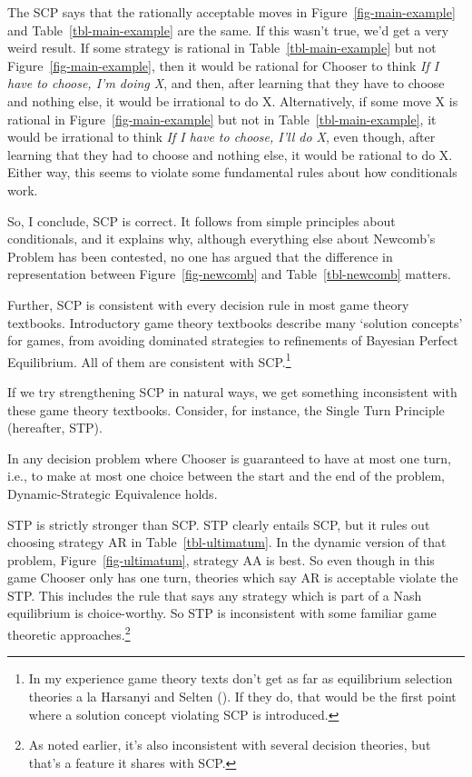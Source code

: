 \documentclass[
  10pt,
  letterpaper,
  DIV=11,
  numbers=noendperiod,
  twoside]{scrartcl}
\providecommand{\tightlist}{%
  \setlength{\itemsep}{0pt}\setlength{\parskip}{0pt}}\usepackage{longtable,booktabs,array}
\begin{document}
The SCP says that the rationally acceptable moves in
Figure~\ref{fig-main-example} and Table~\ref{tbl-main-example} are the
same. If this wasn't true, we'd get a very weird result. If some
strategy is rational in Table~\ref{tbl-main-example} but not
Figure~\ref{fig-main-example}, then it would be rational for Chooser to
think \emph{If I have to choose, I'm doing X}, and then, after learning
that they have to choose and nothing else, it would be irrational to do
X. Alternatively, if some move X is rational in
Figure~\ref{fig-main-example} but not in Table~\ref{tbl-main-example},
it would be irrational to think \emph{If I have to choose, I'll do X},
even though, after learning that they had to choose and nothing else, it
would be rational to do X. Either way, this seems to violate some
fundamental rules about how conditionals work.

So, I conclude, SCP is correct. It follows from simple principles about
conditionals, and it explains why, although everything else about
Newcomb's Problem has been contested, no one has argued that the
difference in representation between Figure~\ref{fig-newcomb} and
Table~\ref{tbl-newcomb} matters.

Further, SCP is consistent with every decision rule in most game theory
textbooks. Introductory game theory textbooks describe many `solution
concepts' for games, from avoiding dominated strategies to refinements
of Bayesian Perfect Equilibrium. All of them are consistent with
SCP.\footnote{In my experience game theory texts don't get as far as
  equilibrium selection theories a la Harsanyi and Selten
  (). If they do, that would be
  the first point where a solution concept violating SCP is introduced.}

If we try strengthening SCP in natural ways, we get something
inconsistent with these game theory textbooks. Consider, for instance,
the Single Turn Principle (hereafter, STP).

\begin{description}
\tightlist
\item[Single Turn Principle]
In any decision problem where Chooser is guaranteed to have at most one
turn, i.e., to make at most one choice between the start and the end of
the problem, Dynamic-Strategic Equivalence holds.
\end{description}

STP is strictly stronger than SCP. STP clearly entails SCP, but it rules
out choosing strategy AR in Table~\ref{tbl-ultimatum}. In the dynamic
version of that problem, Figure~\ref{fig-ultimatum}, strategy AA is
best. So even though in this game Chooser only has one turn, theories
which say AR is acceptable violate the STP. This includes the rule that
says any strategy which is part of a Nash equilibrium is choice-worthy.
So STP is inconsistent with some familiar game theoretic
approaches.\footnote{As noted earlier, it's also inconsistent with
  several decision theories, but that's a feature it shares with SCP.}
\end{document}
